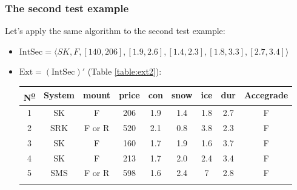 \documentclass[12pt]{report}
\begin{document}
\begin{solution}
\begin{enumerate}
        \subsubsection*{The second test example}
        Let's apply the same algorithm to the second test example:
        \begin{itemize}
            \item $\text{IntSec} = \langle SK, F, [140, 206], [1.9, 2.6], [1.4,2.3], [1.8, 3.3], [2.7, 3.4]\rangle$
            \item $\text{Ext} = (\text{IntSec})'$ (Table \ref{table:ext2}):
            \begin{table}[H]
                \centering
                \begin{tabular}{|c|c|c|c|c|c|c|c|c|}
                \hline
                N\textsuperscript{\underline{o}} &
                  System &
                  mount &
                  price &
                  con &
                  snow &
                  ice &
                  dur &
                  Accegrade \\ \hline
                \rowcolor[HTML]{34FF34} 
                1 &
                  SK &
                  F &
                  206 &
                  1.9 &
                  1.4 &
                  1.8 &
                  2.7 &
                  F \\ \hline
                2 &
                  \cellcolor[HTML]{FE0000}SRK &
                  \cellcolor[HTML]{FFFFFF}F or R &
                  520 &
                  2.1 &
                  0.8 &
                  3.8 &
                  2.3 &
                  F \\ \hline
                3 &
                  SK &
                  F &
                  160 &
                  \cellcolor[HTML]{FE0000}1.7 &
                  1.9 &
                  1.6 &
                  3.7 &
                  F \\ \hline
                4 &
                  SK &
                  F &
                  \cellcolor[HTML]{FE0000}213 &
                  1.7 &
                  2.0 &
                  2.4 &
                  3.4 &
                  F \\ \hline
                5 &
                  \cellcolor[HTML]{FE0000}SMS &
                  F or R &
                  \cellcolor[HTML]{FFFFFF}598 &
                  1.6 &
                  2.4 &
                  7 &
                  2.8 &
                  F \\ \hline
                \rowcolor[HTML]{FFFFFF} 

\end{tabular}
\end{table}
\end{itemize}
\end{enumerate}
\end{solution}
\end{document}
